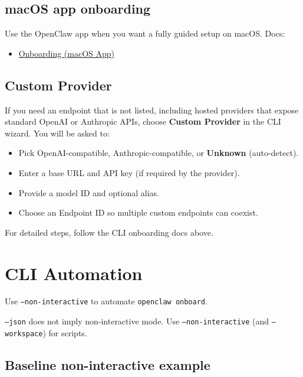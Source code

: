 \subsection{macOS app onboarding}


Use the OpenClaw app when you want a fully guided setup on macOS. Docs:

\begin{itemize}
  \item \href{/start/onboarding}{Onboarding (macOS App)}
\end{itemize}


\subsection{Custom Provider}


If you need an endpoint that is not listed, including hosted providers that
expose standard OpenAI or Anthropic APIs, choose \textbf{Custom Provider} in the
CLI wizard. You will be asked to:

\begin{itemize}
  \item Pick OpenAI-compatible, Anthropic-compatible, or \textbf{Unknown} (auto-detect).
  \item Enter a base URL and API key (if required by the provider).
  \item Provide a model ID and optional alias.
  \item Choose an Endpoint ID so multiple custom endpoints can coexist.
\end{itemize}


For detailed steps, follow the CLI onboarding docs above.


\clearpage

\section{CLI Automation}


Use \texttt{--non-interactive} to automate \texttt{openclaw onboard}.

\texttt{--json} does not imply non-interactive mode. Use \texttt{--non-interactive} (and \texttt{--workspace}) for scripts.

\subsection{Baseline non-interactive example}


